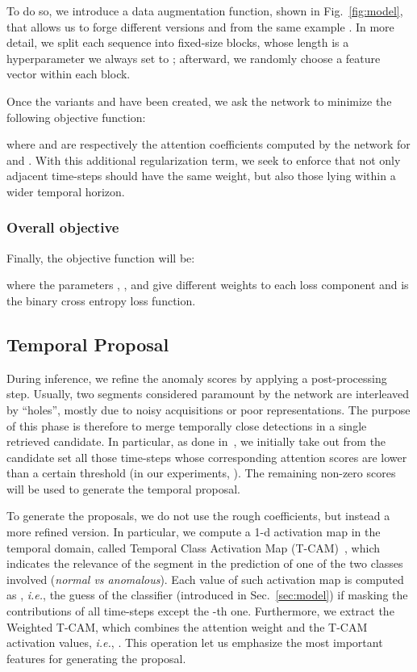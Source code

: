 \documentclass[runningheads]{llncs}
\begin{document}
To do so, we introduce a data augmentation function, shown in Fig.~\ref{fig:model}, that allows us to forge different versions  and  from the same example . In more detail, we split each sequence  into fixed-size blocks, whose length  is a hyperparameter we always set to ; afterward, we randomly choose a feature vector within each block.

Once the variants  and  have been created, we ask the network to minimize the following objective function:

where  and  are respectively the attention coefficients computed by the network for  and . With this additional regularization term, we seek to enforce that not only adjacent time-steps should have the same weight, but also those lying within a wider temporal horizon. 
\subsubsection{Overall objective} Finally, the objective function will be:

where the parameters , , and  give different weights to each loss component and  is the binary cross entropy loss function.
\subsection{Temporal Proposal}
During inference, we refine the anomaly scores by applying a post-processing step. Usually, two segments considered paramount by the network are interleaved by ``holes'', mostly due to noisy acquisitions or poor representations. The purpose of this phase is therefore to merge temporally close detections in a single retrieved candidate. In particular, as done in~\cite{zhou2016learning}, we initially take out from the candidate set all those time-steps whose corresponding attention scores are lower than a certain threshold (in our experiments, ). The remaining non-zero scores will be used to generate the temporal proposal. 

To generate the proposals, we do not use the rough coefficients, but instead a more refined version. In particular, we compute a 1-d activation map in the temporal domain, called Temporal Class Activation Map (T-CAM)~\cite{zhou2016learning}, which indicates the relevance of the segment  in the prediction of one of the two classes involved (\textit{normal vs anomalous}). Each value  of such activation map is computed as , \textit{i.e.}, the guess of the classifier  (introduced in Sec.~\ref{sec:model}) if masking the contributions of all time-steps except the -th one. Furthermore, we extract the Weighted T-CAM, which combines the attention weight and the T-CAM activation values, \textit{i.e.}, . This operation let us emphasize the most important features for generating the proposal.
\end{document}

